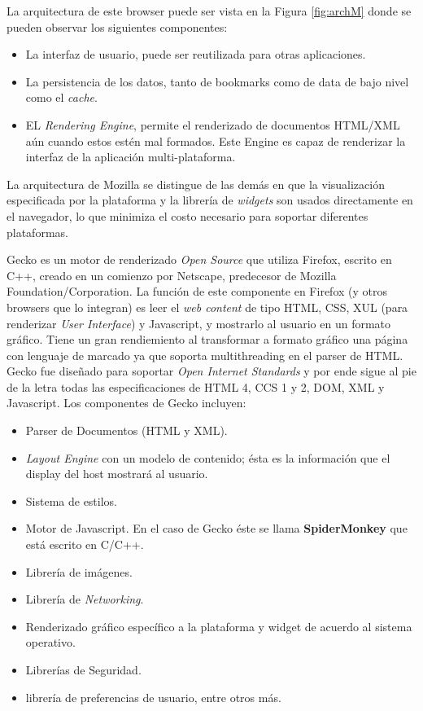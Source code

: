         La arquitectura de este browser puede ser vista en la Figura \ref{fig:archM} donde se pueden observar los siguientes componentes:
                \begin{itemize}
                    \item La interfaz de usuario, puede ser reutilizada para otras aplicaciones.
                    \item La persistencia de los datos, tanto de bookmarks como de data de bajo nivel como el \textit{cache}.
                    \item EL \textit{Rendering Engine}, permite el renderizado de documentos HTML/XML aún cuando estos estén mal formados. Este Engine es capaz de renderizar la interfaz de la aplicación multi-plataforma.
                \end{itemize}
        La arquitectura de Mozilla se distingue de las demás en que la visualización especificada por la plataforma y la librería de \textit{widgets} son usados directamente en el navegador, lo que minimiza el costo necesario para soportar diferentes plataformas.

        Gecko es un motor de renderizado \textit{Open Source} que utiliza Firefox, escrito en C++, creado en un comienzo por Netscape, predecesor de Mozilla Foundation/Corporation. La función de este componente en Firefox (y otros browsers que lo integran) es leer el \textit{web content} de tipo HTML, CSS, XUL (para renderizar \textit{User Interface}) y Javascript, y mostrarlo al usuario en un formato gráfico. Tiene un gran rendiemiento al transformar a formato gráfico una página con lenguaje de marcado ya que soporta multithreading en el parser de HTML. Gecko fue diseñado para soportar \textit{Open Internet Standards} y por ende sigue al pie de la letra todas las especificaciones de HTML 4, CCS 1 y 2, DOM, XML y Javascript. Los componentes de Gecko incluyen:
            \begin{itemize}
                \item Parser de Documentos (HTML y XML).
                \item \textit{Layout Engine} con un modelo de contenido; ésta es la información que el display del host mostrará al usuario.
                \item Sistema de estilos.
                \item Motor de Javascript. En el caso de Gecko éste se llama \textbf{SpiderMonkey} que está escrito en C/C++.
                \item Librería de imágenes.
                \item Librería de \textit{Networking}.
                \item Renderizado gráfico específico a la plataforma y widget de acuerdo al sistema operativo.
                \item Librerías de Seguridad.
                \item librería de preferencias de usuario, entre otros más.
            \end{itemize}

